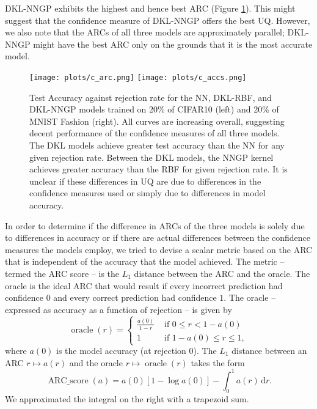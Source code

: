 \documentclass{article}
\begin{document}
DKL-NNGP exhibits the highest and hence best ARC (Figure \ref{fig-arc}). This might suggest that the confidence measure of DKL-NNGP offers the best UQ. However, we also note that the ARCs of all three models are approximately parallel; DKL-NNGP might have the best ARC only on the grounds that it is the most accurate model.

\begin{figure}
\centering
\texttt{[image: plots/c\_arc.png]}%
\texttt{[image: plots/c\_accs.png]}
\caption{\label{fig-arc} Test Accuracy against rejection rate for the NN, DKL-RBF, and DKL-NNGP models trained on 20\% of CIFAR10 (left) and 20\% of MNIST Fashion (right). All curves are increasing overall, suggesting decent performance of the confidence measures of all three models. The DKL models achieve greater test accuracy than the NN for any given rejection rate. Between the DKL models, the NNGP kernel achieves greater accuracy than the RBF for given rejection rate. It is unclear if these differences in UQ are due to differences in the confidence measures used or simply due to differences in model accuracy.}
\end{figure}

In order to determine if the difference in ARCs of the three models is solely due to differences in accuracy or if there are actual differences between the confidence measures the models employ, we tried to devise a scalar metric based on  the ARC that is independent of the accuracy that the model achieved. The metric -- termed the ARC score -- is the $L_1$ distance between the ARC and the oracle. The oracle is the ideal ARC that would result if every incorrect prediction had confidence $0$ and every correct prediction had confidence $1$. The oracle -- expressed as accuracy as a function of rejection -- is given by
\begin{equation}
\operatorname{oracle}(r) =
\begin{cases}
\frac{a(0)}{1-r} & \mbox{ if } 0 \leq r < 1-a(0) \\
1 & \mbox{ if } 1-a(0) \leq r \leq 1,
\end{cases}
\end{equation}
where $a(0)$ is the model accuracy (at rejection $0$). The $L_1$ distance between an ARC $r\mapsto a(r)$ and the oracle $r\mapsto \operatorname{oracle}(r)$ takes the form
\begin{equation}
\operatorname{ARC\_score}(a) = a(0)[1-\log a(0)] - \int_0^1 a(r)\,\mathrm{d}r.
\end{equation}
We approximated the integral on the right with a trapezoid sum.
\end{document}
